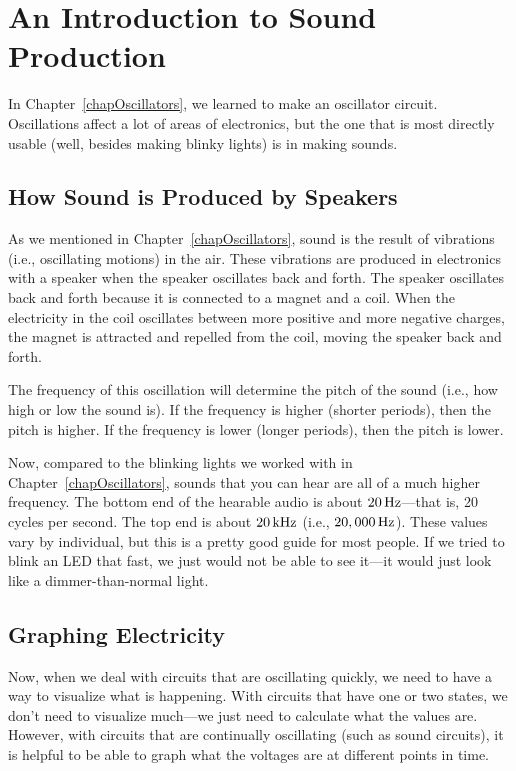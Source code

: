 \chapter{An Introduction to Sound Production}
\label{chapSound}

In Chapter~\ref{chapOscillators}, we learned to make an oscillator circuit.
Oscillations affect a lot of areas of electronics, but the one that is most directly usable (well, besides making blinky lights) is in making sounds.

\section{How Sound is Produced by Speakers}

As we mentioned in Chapter~\ref{chapOscillators}, sound is the result of vibrations (i.e., oscillating motions) in the air.
These vibrations are produced in electronics with a speaker when the speaker oscillates back and forth.
The speaker oscillates back and forth because it is connected to a magnet and a coil.
When the electricity in the coil oscillates between more positive and more negative charges, the magnet is attracted and repelled from the coil, moving the speaker back and forth.

The frequency of this oscillation will determine the pitch of the sound (i.e., how high or low the sound is).
If the frequency is higher (shorter periods), then the pitch is higher.
If the frequency is lower (longer periods), then the pitch is lower.

Now, compared to the blinking lights we worked with in Chapter~\ref{chapOscillators}, sounds that you can hear are all of a much higher frequency.
The bottom end of the hearable audio is about $20\,\si{\hertz}$---that is, 20 cycles per second.
The top end is about $20\,\si{\kilo\hertz}$ (i.e., $20,000\,\si{\hertz}$).
These values vary by individual, but this is a pretty good guide for most people.
If we tried to blink an LED that fast, we just would not be able to see it---it would just look like a dimmer-than-normal light.

\section{Graphing Electricity}

Now, when we deal with circuits that are oscillating quickly, we need to have a way to visualize what is happening.
With circuits that have one or two states, we don't need to visualize much---we just need to calculate what the values are.
However, with circuits that are continually oscillating (such as sound circuits), it is helpful to be able to graph what the voltages are at different points in time.

